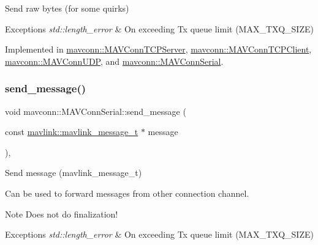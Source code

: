 Send raw bytes (for some quirks) 


\begin{DoxyExceptions}{Exceptions}
{\em std\+::length\+\_\+error} & On exceeding Tx queue limit (M\+A\+X\+\_\+\+T\+X\+Q\+\_\+\+S\+I\+ZE) \\
\hline
\end{DoxyExceptions}


Implemented in \mbox{\hyperlink{group__mavconn_ga4eedf8da39d9dee8cf84074d010ddf0d}{mavconn\+::\+M\+A\+V\+Conn\+T\+C\+P\+Server}}, \mbox{\hyperlink{group__mavconn_gac327ab4a27b6de2da3c594d93c599312}{mavconn\+::\+M\+A\+V\+Conn\+T\+C\+P\+Client}}, \mbox{\hyperlink{group__mavconn_ga7a1a56365cb5355da86a6a6e2bb4bc8e}{mavconn\+::\+M\+A\+V\+Conn\+U\+DP}}, and \mbox{\hyperlink{group__mavconn_ga6073d6f88157f3b29ee519eafe16f8fd}{mavconn\+::\+M\+A\+V\+Conn\+Serial}}.

\mbox{\label{group__mavconn_ga452a97c9cd256b591eee063a1927a93a}} 
\subsubsection{\texorpdfstring{send\_message()}{send\_message()}\hspace{0.1cm}{\footnotesize\ttfamily [1/10]}}
{\footnotesize\ttfamily void mavconn\+::\+M\+A\+V\+Conn\+Serial\+::send\+\_\+message (\begin{DoxyParamCaption}\item[{const \mbox{\hyperlink{include__v0_89_2mavlink__types_8h_a63b963764c09dc72f4910c1521e325b9}{mavlink\+::mavlink\+\_\+message\+\_\+t}} $\ast$}]{message }\end{DoxyParamCaption})\hspace{0.3cm}{\ttfamily [override]}, {\ttfamily [virtual]}}



Send message (mavlink\+\_\+message\+\_\+t) 

Can be used to forward messages from other connection channel.

\begin{DoxyNote}{Note}
Does not do finalization!
\end{DoxyNote}

\begin{DoxyExceptions}{Exceptions}
{\em std\+::length\+\_\+error} & On exceeding Tx queue limit (M\+A\+X\+\_\+\+T\+X\+Q\+\_\+\+S\+I\+ZE) \\
\hline
\end{DoxyExceptions}

